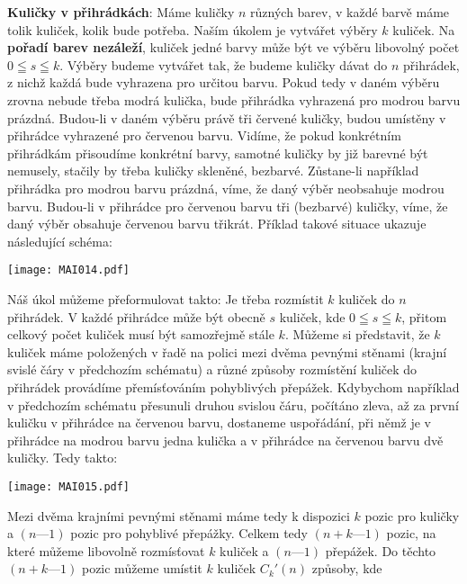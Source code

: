 \begin{example}\label{mai:exam009}
  \textbf{Kuličky v přihrádkách}:\newline
  Máme kuličky \(n\) různých barev, v každé barvě máme tolik kuliček, kolik bude potřeba. Naším 
  úkolem je vytvářet výběry \(k\) kuliček. Na \textbf{pořadí barev nezáleží}, kuliček jedné barvy 
  může být ve výběru libovolný počet \(0\leqq s \leqq k\). Výběry budeme vytvářet tak, že budeme 
  kuličky dávat do \(n\) přihrádek, z nichž každá bude vyhrazena pro určitou barvu. Pokud tedy v 
  daném výběru zrovna nebude třeba modrá kulička, bude přihrádka vyhrazená pro modrou barvu 
  prázdná. Budou-li v daném výběru právě tři červené kuličky, budou umístěny v přihrádce vyhrazené 
  pro červenou barvu. Vidíme, že pokud konkrétním přihrádkám přisoudíme konkrétní barvy, samotné 
  kuličky by již barevné být nemusely, stačily by třeba kuličky skleněné, bezbarvé. Zůstane-li 
  například přihrádka pro modrou barvu prázdná, víme, že daný výběr neobsahuje modrou barvu. 
  Budou-li v přihrádce pro červenou barvu tři (bezbarvé) kuličky, víme, že daný výběr obsahuje 
  červenou barvu třikrát. Příklad takové situace ukazuje následující schéma:
  
  {\centering
    \texttt{[image: MAI014.pdf]}
    \par}

  Náš úkol můžeme přeformulovat takto: Je třeba rozmístit \(k\) kuliček do \(n\) přihrádek. V každé 
  přihrádce může být obecně \(s\) kuliček, kde \(0\leqq s \leqq k\), přitom celkový počet kuliček 
  musí být samozřejmě stále \(k\). Můžeme si představit, že \(k\) kuliček máme položených v řadě na 
  polici mezi dvěma pevnými stěnami (krajní svislé čáry v předchozím schématu) a různé způsoby 
  rozmístění kuliček do přihrádek provádíme přemísťováním pohyblivých přepážek. Kdybychom například 
  v předchozím schématu přesunuli druhou svislou čáru, počítáno zleva, až za první kuličku v 
  přihrádce na červenou barvu, dostaneme uspořádání, při němž je v přihrádce na modrou barvu jedna 
  kulička a v přihrádce na červenou barvu dvě kuličky. Tedy takto:

  {\centering
    \texttt{[image: MAI015.pdf]}
    \par}

  Mezi dvěma krajními pevnými stěnami máme tedy k dispozici \(k\) pozic pro kuličky a \((n — 1)\) 
  pozic pro pohyblivé přepážky. Celkem tedy \((n + k — 1)\) pozic, na které můžeme libovolně 
  rozmísťovat \(k\) kuliček a \((n — 1)\) přepážek. Do těchto \((n + k — 1)\) pozic můžeme umístit 
  \(k\) kuliček \(C_k'(n)\) způsoby, kde
  

\end{example}
